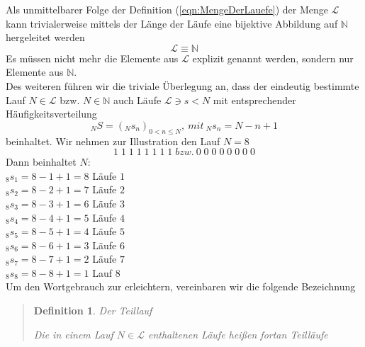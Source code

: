 \documentclass[11pt,oneside,a4paper]{scrreprt}
\newtheorem{defi}{Definition}
\begin{document}
\noindent Als unmittelbarer Folge der Definition (\ref{eqn:MengeDerLauefe}) der Menge $\mathcal{L}$ kann trivialerweise mittels der Länge der Läufe eine bijektive Abbildung auf $\mathbb N$ hergeleitet werden
\begin{equation}\label{eqn:LEquivN}
	\mathcal L \equiv \mathbb N
\end{equation}
Es müssen nicht mehr die Elemente aus $\mathcal{L}$ explizit genannt werden, sondern nur Elemente aus $\mathbb N$.\\

Des weiteren führen wir die triviale Überlegung an, dass der eindeutig bestimmte Lauf $N\in\mathcal L$ bzw. $N\in\mathbb N$ auch Läufe $\mathcal L\ni s<N$ mit entsprechender Häufigkeitsverteilung
\begin{equation}\label{eq:Häufigkeiten der Teilläufe}
_NS=(_Ns_n)_{0<n\leq N},\ mit\ _Ns_n=N-n+1
\end{equation}
beinhaltet. Wir nehmen zur Illustration den Lauf $N=8$
\begin{equation}\label{eqn:TeillaufInDemLauf}
	1\;1\;1\;1\;1\;1\;1\;1\; bzw.\ 0\;0\;0\;0\;0\;0\;0\;0
\end{equation}
Dann beinhaltet $N$:\\
\indent	 $_8s_1=8-1+1=8$ Läufe $1$\\
\indent  $_8s_2=8-2+1=7$ Läufe $2$\\
\indent  $_8s_3=8-3+1=6$ Läufe $3$\\
\indent  $_8s_4=8-4+1=5$ Läufe $4$\\
\indent  $_8s_5=8-5+1=4$ Läufe $5$\\
\indent  $_8s_6=8-6+1=3$ Läufe $6$\\
\indent  $_8s_7=8-7+1=2$ Läufe $7$\\
\indent  $_8s_8=8-8+1=1$ Lauf $8$\\

\noindent Um den Wortgebrauch zur erleichtern, vereinbaren wir die folgende Bezeichnung

\begin{quote}
	\begin{defi}\label{def:Teillauf} Der Teillauf\\
	\begin{center}
		Die in einem Lauf $N\in \mathcal L$ enthaltenen Läufe heißen fortan Teilläufe
	\end{center}
\end{defi}
\end{quote}
\end{document}
